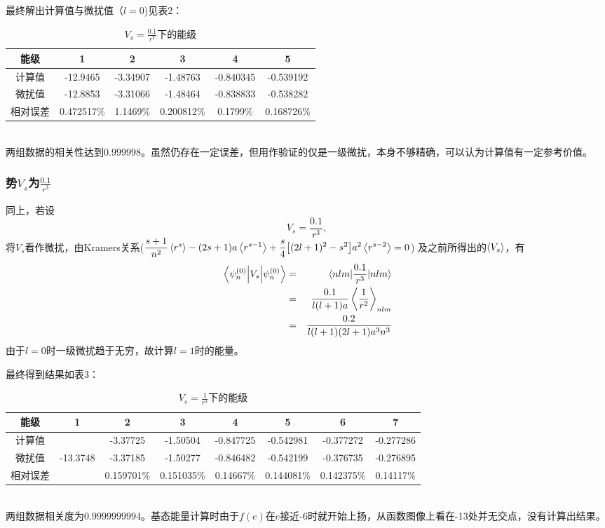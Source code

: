 \documentclass{ctexart}
\begin{document}
最终解出计算值与微扰值（$l=0$)见表2：
\begin{table}[!htbp]
  \centering
  \begin{tabular}{|c|c|c|c|c|c|}
    \hline
    能级 & 1 & 2 & 3 & 4 & 5 \\
    \hline
    计算值 & -12.9465 & -3.34907 & -1.48763 & -0.840345 & -0.539192 \\
    \hline
    微扰值 & -12.8853 & -3.31066 & -1.48464 & -0.838833 & -0.538282 \\
    \hline
    相对误差 & 0.472517\% & 1.1469\% & 0.200812\% & 0.1799\% & 0.168726\% \\
    \hline
  \end{tabular}
  \caption{$\displaystyle V_s=\frac{0.1}{r^2}$下的能级}\label{}
\end{table}\\
两组数据的相关性达到$0.999998$。虽然仍存在一定误差，但用作验证的仅是一级微扰，本身不够精确，可以认为计算值有一定参考价值。
\subsubsection{势$V_s$为$\displaystyle\frac{0.1}{r^3}$}
同上，若设
\begin{equation}\label{Vs2}
  V_s=\frac{0.1}{r^3},
\end{equation}
将$V_s$看作微扰，由Kramers关系($\displaystyle\frac{s+1}{n^2}\ev{r^s}-(2s+1)a\ev{r^{s-1}}+\frac{s}{4}\bqty{(2l+1)^2-s^2}a^2\ev{r^{s-2}}=0$) 及之前所得出的$\ev{V_s}$，有
\begin{eqnarray*}
 \ev{V_s}{\psi_n^{(0)}} &=& \mel{nlm}{\frac{0.1}{r^3}}{nlm} \\
   &=& \frac{0.1}{l(l+1)a}\ev{\frac{1}{r^2}}_{nlm}  \\
   &=& \frac{0.2}{l(l+1)(2l+1)a^3n^3}
\end{eqnarray*}
由于$l=0$时一级微扰趋于无穷，故计算$l=1$时的能量。

最终得到结果如表3：
\begin{table}[!htbp]
  \centering
  \begin{tabular}{|c|c|c|c|c|c|c|c|}
    \hline
    能级 & 1 & 2 & 3 & 4 & 5 & 6 & 7 \\
    \hline
    计算值 &  & -3.37725 & -1.50504 & -0.847725 & -0.542981 & -0.377272 & -0.277286  \\
    \hline
    微扰值 & -13.3748 & -3.37185 & -1.50277 & -0.846482 & -0.542199 & -0.376735 & -0.276895 \\
    \hline
    相对误差 &  & 0.159701\% & 0.151035\% & 0.14667\% & 0.144081\% & 0.142375\% & 0.14117\% \\
    \hline
  \end{tabular}
  \caption{$\displaystyle V_s=\frac{1}{r^3}$下的能级}\label{}
\end{table}\\
两组数据相关度为$0.9999999994$。基态能量计算时由于$f(e)$在$e$接近-6时就开始上扬，从函数图像上看在-13处并无交点，没有计算出结果。
\end{document}
